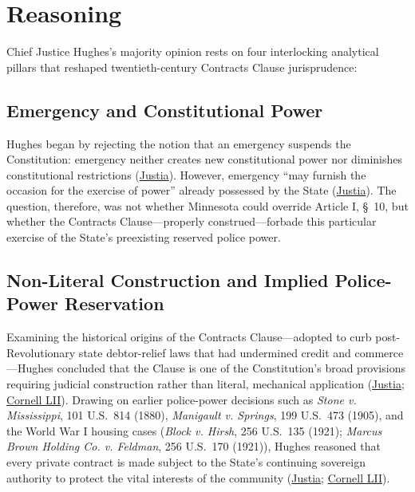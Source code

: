 \documentclass[12pt]{article}
\begin{document}
\section{Reasoning}

Chief Justice Hughes's majority opinion rests on four interlocking analytical pillars that reshaped twentieth-century Contracts Clause jurisprudence:

\subsection{Emergency and Constitutional Power}
Hughes began by rejecting the notion that an emergency suspends the Constitution: emergency neither creates new constitutional power nor diminishes constitutional restrictions (\href{https://supreme.justia.com/cases/federal/us/290/398/}{Justia}). However, emergency ``may furnish the occasion for the exercise of power'' already possessed by the State (\href{https://supreme.justia.com/cases/federal/us/290/398/}{Justia}). The question, therefore, was not whether Minnesota could override Article I, \S\ 10, but whether the Contracts Clause---properly construed---forbade this particular exercise of the State's preexisting reserved police power.

\subsection{Non-Literal Construction and Implied Police-Power Reservation}
Examining the historical origins of the Contracts Clause---adopted to curb post-Revolutionary state debtor-relief laws that had undermined credit and commerce---Hughes concluded that the Clause is one of the Constitution's broad provisions requiring judicial construction rather than literal, mechanical application (\href{https://supreme.justia.com/cases/federal/us/290/398/}{Justia}; \href{https://www.law.cornell.edu/constitution-conan/article-1/section-10/clause-1/historical-background-on-the-contract-clause}{Cornell LII}). Drawing on earlier police-power decisions such as \emph{Stone v. Mississippi}, 101 U.S.\ 814 (1880), \emph{Manigault v. Springs}, 199 U.S.\ 473 (1905), and the World War I housing cases (\emph{Block v. Hirsh}, 256 U.S.\ 135 (1921); \emph{Marcus Brown Holding Co. v. Feldman}, 256 U.S.\ 170 (1921)), Hughes reasoned that every private contract is made subject to the State's continuing sovereign authority to protect the vital interests of the community (\href{https://supreme.justia.com/cases/federal/us/290/398/}{Justia}; \href{https://www.law.cornell.edu/constitution-conan/article-1/section-10/clause-1/blaisdell-case-and-state-modifications-to-private-contracts}{Cornell LII}).
\end{document}
